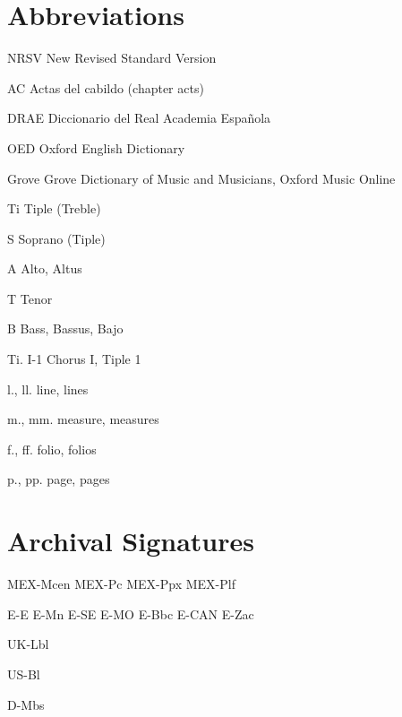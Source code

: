 \section{Abbreviations}

NRSV
New Revised Standard Version

AC
Actas del cabildo (chapter acts)

DRAE
Diccionario del Real Academia Española

OED
Oxford English Dictionary

Grove
Grove Dictionary of Music and Musicians, Oxford Music Online

Ti
Tiple (Treble)

S
Soprano (Tiple)

A
Alto, Altus

T
Tenor

B
Bass, Bassus, Bajo

Ti. I-1
Chorus I, Tiple 1

l., ll.
line, lines

m., mm.
measure, measures

f., ff.
folio, folios

p., pp.
page, pages


\section{Archival Signatures}

MEX-Mcen
MEX-Pc
MEX-Ppx
MEX-Plf

E-E
E-Mn
E-SE
E-MO
E-Bbc
E-CAN
E-Zac

UK-Lbl

US-Bl

D-Mbs
\endinput


